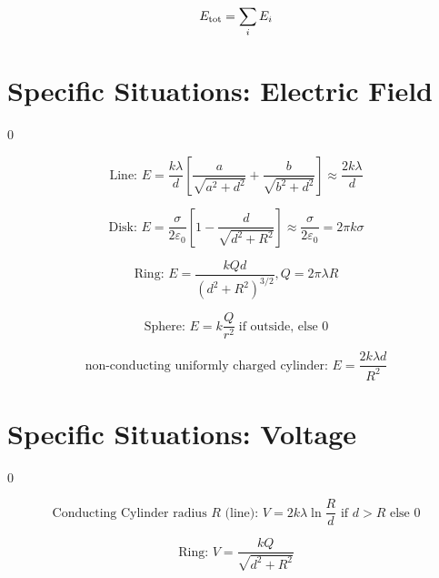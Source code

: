 \documentclass[12pt]{article}
\begin{document}
\begin{equation}
	E_{\rm tot} = \sum_i E_i
\end{equation}

\section{Specific Situations: Electric Field}
\setcounter {equation} 0

\begin{equation}
	\text{Line: } E = \dfrac{k \lambda} d \left[\dfrac a{\sqrt{a^2 + d^2}} + \dfrac b{\sqrt{b^2 + d^2}}\right] \approx \dfrac{2 k \lambda} d
\end{equation}

\begin{equation}
	\text{Disk: } E = \dfrac \sigma{2 \varepsilon_0} \left[1 - \dfrac d{\sqrt{d^2 + R^2}}\right] \approx \dfrac \sigma{2 \varepsilon_0} = 2 \pi k \sigma
\end{equation}

\begin{equation}
	\text{Ring: } E = \dfrac{k Q d}{\left(d^2 + R^2\right)^{3/2}}, Q = 2 \pi \lambda R
\end{equation}

\begin{equation}
	\text{Sphere: } E = k \dfrac Q{r^2} \; \text{if outside, else 0}
\end{equation}

\begin{equation}
	\text{non-conducting uniformly charged cylinder: } E = \dfrac{2 k \lambda d}{R^2}
\end{equation}

\section{Specific Situations: Voltage}
\setcounter {equation} 0

\begin{equation}
	\text{Conducting Cylinder radius $R$ (line): } V = 2 k \lambda \ln \dfrac R d \text{ if $d > R$ else 0}
\end{equation}

\begin{equation}
	\text{Ring: } V = \dfrac{k Q}{\sqrt{d^2 + R^2}}
\end{equation}
\end{document}
